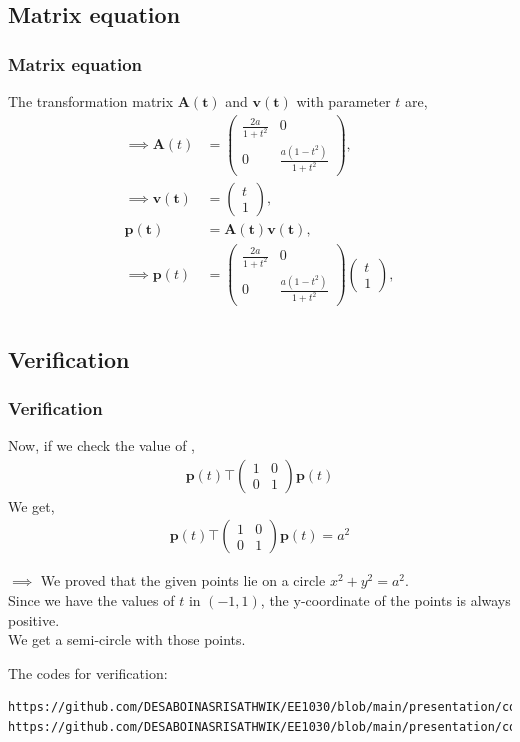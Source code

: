 \documentclass{beamer}
\theoremstyle{remark}
\newcommand{\myvec}[1]{\ensuremath{\begin{pmatrix}#1\end{pmatrix}}}
\let\vec\mathbf
\numberwithin{equation}{section}
\begin{document}
\subsection{Matrix equation}
\begin{frame}
\frametitle{Matrix equation}
	The transformation matrix $\vec{A(t)}$ and $\vec{v(t)}$ with parameter $t$ are,\\
	\begin{align}
		\implies \mathbf{A}(t) & = \myvec{ \frac{2a}{1+t^2} & 0 \\ 0 & \frac{a(1-t^2)}{1+t^2}},\\ \implies \mathbf{v(t)} &= \myvec{t \\ 1},\\ \mathbf{p(t)} &= \mathbf{A(t)} \mathbf{v(t)}, \\\implies  \mathbf{p}(t) & = \myvec{ \frac{2a}{1+t^2} & 0 \\ 0 & \frac{a(1 - t^2)}{1+t^2} } \myvec{t \\ 1},\\ 
	\end{align}
\end{frame}
\subsection{Verification}
\begin{frame}[fragile]
\frametitle{Verification}
Now, if we check the value of ,
    \begin{align}
    \mathbf{p}(t)\top \myvec{ 1 & 0 \\ 0 & 1 } \mathbf{p}(t)
    \end{align}
	We get,\\
  \begin{align}
    \mathbf{p}(t)\top \myvec{ 1 & 0 \\ 0 & 1 } \mathbf{p}(t)=a^2
    \end{align}

	$\implies$ We proved that the given points lie on a circle $x^2 + y^2 = a^2$.\\
	Since we have the values of $t$ in $(-1,1)$, the y-coordinate of the points is always positive.\\
	We get a semi-circle with those points.

The codes for verification:
 {\footnotesize
\begin{lstlisting}
https://github.com/DESABOINASRISATHWIK/EE1030/blob/main/presentation/codes/plot.py
https://github.com/DESABOINASRISATHWIK/EE1030/blob/main/presentation/codes/code.c
\end{lstlisting}}


\end{frame}
\end{document}
